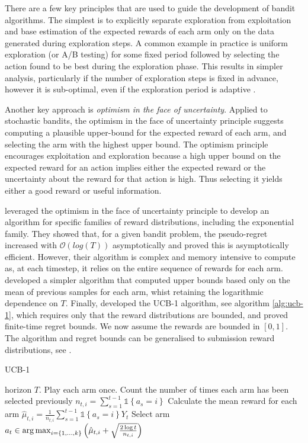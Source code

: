 \documentclass[11pt,a4paper,oneside]{book}
\newcommand{\set}[1]{\left\{#1\right\}}
\newcommand{\ind}[1]{\mathds{1}\!\!\set{#1}}
\newcommand{\argmax}{\operatornamewithlimits{arg\,max}}
\newcommand{\bigo}[1]{\mathcal{O}\left( #1 \right)}
\theoremstyle{plain}
\theoremstyle{definition}
\begin{document}
There are a few key principles that are used to guide the development of bandit algorithms. The simplest is to explicitly separate exploration from exploitation and base estimation of the expected rewards of each arm only on the data generated during exploration steps. A common example in practice is uniform exploration (or A/B testing) for some fixed period followed by selecting the action found to be best during the exploration phase. This results in simpler analysis, particularly if the number of exploration steps is fixed in advance, however it is sub-optimal, even if the exploration period is adaptive \citep{NIPS2016_6179}. 

Another key approach is \emph{optimism in the face of uncertainty}. Applied to stochastic bandits, the optimism in the face of uncertainty principle suggests computing a plausible upper-bound for the expected reward of each arm, and selecting the arm with the highest upper bound. The optimism principle encourages exploitation and exploration because a high upper bound on the expected reward for an action implies either the expected reward or the uncertainty about the reward for that action is high. Thus selecting it yields either a good reward or useful information. 

\citet{Lai1985} leveraged the optimism in the face of uncertainty principle to develop an algorithm for specific families of reward distributions, including the exponential family. They showed that, for a given bandit problem, the pseudo-regret increased with $\bigo{log(T)}$ asymptotically and proved this is asymptotically efficient. However, their algorithm is complex and memory intensive to compute as, at each timestep, it relies on the entire sequence of rewards for each arm. \citet{Agrawal1995} developed a simpler algorithm that computed upper bounds based only on the mean of previous samples for each arm, whist retaining the logarithmic dependence on $T$. Finally, \citet{Auer2002} developed the UCB-1 algorithm, see algorithm \ref{alg:ucb-1}, which requires only that the reward distributions are bounded, and proved finite-time regret bounds. We now assume the rewards are bounded in $[0,1]$. The algorithm and regret bounds can be generalised to submission reward distributions, see \citet{Bubeck2012}.

\begin{algorithm}[H]
\caption{UCB-1}\label{alg:ucb-1}
\begin{algorithmic}[1]
 horizon $T$.
\STATE Play each arm once. 
\STATE Count the number of times each arm has been selected previously $n_{t,i} = \sum_{s=1}^{t-1} \ind{a_s = i}$
\STATE Calculate the mean reward for each arm $\hat{\mu}_{t,i} = \frac{1}{n_{t,i}} \sum_{s=1}^{t-1}\ind{a_s = i}Y_t$
\STATE Select arm $a_t \in \argmax_{i = \set{1,...,k}}\left(\hat{\mu}_{t,i}+\sqrt{\frac{2 \log{t}}{n_{t,i}}}\right)$
\ENDFOR
\end{algorithmic}
\end{algorithm}
 
\end{document}
